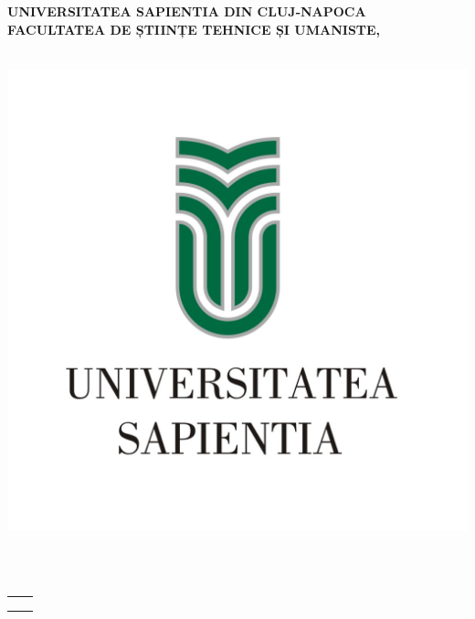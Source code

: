 
\begin{titlepage}
	\begin{center}
	
		\large{\bfseries UNIVERSITATEA SAPIENTIA DIN CLUJ-NAPOCA} \\
		\large{\bfseries FACULTATEA DE ȘTIINȚE TEHNICE ȘI UMANISTE,} \\
		
		\large{\bfseries \szakRO} \\[2.5cm]
		
			\begin{center}
			\includegraphics[scale=2]{images/sapientia-ro}
		\end{center}
		
		\vspace{0.4cm}
		
	
		
		\Large{\Large \cimRO}\\[0.8cm]
		\vspace{0.5cm}
		\textsc{\Large \bfseries \dolgozattipusRO}\\[2.5cm]
		
		{
			\large
		
			\renewcommand{\arraystretch}{0.85}
			\begin{tabular}{cc}
				 \makebox[6.5cm]{Coordonator științific:} & \makebox[6.5cm]{Absolvent:} \\ \noalign{\smallskip}
				 \makebox[6.5cm]{\temavezetoA,} & \makebox[6.5cm]{\szerzo} \\
				 {\temavezetoAfokozatRo}
			\end{tabular}
		}
		
		\vfill
		{\large \bfseries \ev}
	\end{center}
\end{titlepage}